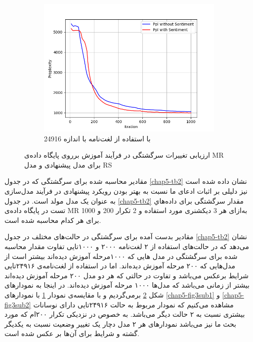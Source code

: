 \begin{figure}[!t]
		\begin{subfigure}{.45\textwidth}
			\includegraphics[scale=.4]{chap5-img/ppl_24916}
			\caption{ با استفاده از  لغت‌نامه با اندازه  24916}
			\label{chap5-fig3sub3}
		\end{subfigure}
	\caption{ارزیابی تغییرات سرگشتگی در فرآیند آموزش برروی پایگاه داده‌ی MR  برای مدل پیشنهادی و مدل RS}
	\label{chap5-fig3}
	\end{figure}

مقادير محاسبه شده برای سرگشتگی که در جدول 
\ref{chap5-tb2}
نشان داده شده است نيز دليلی بر اثبات ادعای ما نسبت به بهتر بودن رويکرد پيشنهادی در فرآیند مدل‌سازی به عنوان یک مدل مولد است. در جدول 
\ref{chap5-tb2}
مقدار سرگشتگی برای داده‌هاي تست در پايگاه داده‌ی 
MR
به‌ازای هر 3 ديکشنری مورد استفاده و 2 تکرار 200 و 1000 برای هر کدام محاسبه شده است.

مقادیر بدست آمده برای سرگشتگی در حالت‌های مختلف در جدول
\ref{chap5-tb2}
نشان می‌‌دهد که در حالت‌های استفاده از ۲ لغت‌نامه ۲۰۰۰ و ۱۰۰۰تایی تفاوت مقدار محاسبه شده برای سرگشتگی در مدل هایی که ۱۰۰۰مرحله آموزش دیده‌اند بیشتر است از مدل‌هایی که ۲۰۰ مرحله آموزش دیده‌اند. اما در استفاده از لغت‌نامه‌ی ۲۴۹۱۶تایی شرایط برعکس می‌‌باشد و تفاوت در حالتی که هر دو مدل ۲۰۰ مرحله آموزش دیده‌اند بیشتر از زمانی‌ می‌‌باشد که مدل‌ها ۱۰۰۰ مرحله آموزش دیده‌اند. در اینجا به نمودارهای شکل
\ref{chap5-fig3}
برمی‌‌گردیم و با مقایسه‌ی نمودار
\ref{chap5-fig3sub3}
با نمودارهای
 \ref{chap5-fig3sub1}
و
 \ref{chap5-fig3sub2}
مشاهده می‌کنیم که نمودار مربوط به حالت ۲۴۹۱۶تایی دارای نوسانات بیشتری نسبت به ۲ حالت دیگر می‌‌باشد. به خصوص در  نزدیکی‌ تکرار ۲۰۰ام که مورد بحث ما نیز می‌‌باشد نمودار‌های هر ۲ مدل دچار یک تغییر وضعیت نسبت به یکدیگر گشته و شرایط برای آن‌ها بر عکس شده است.

